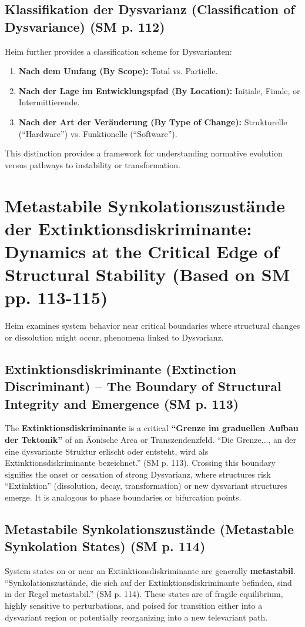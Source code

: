 \documentclass[
    12pt,              %
    a4paper,           %
    headings=normal,   %
    twoside=true,      %
    BCOR=8mm,          %
]{scrbook}
\newcommand{\q}[1]{\enquote{#1}}
\begin{document}
\subsection{Klassifikation der Dysvarianz (Classification of Dysvariance) (SM p. 112)}
\label{sec:ch6_klassifikation_dysvarianz}
Heim further provides a classification scheme for Dysvarianten:
\begin{enumerate}
    \item  \textbf{Nach dem Umfang (By Scope):} Total vs. Partielle.
    \item  \textbf{Nach der Lage im Entwicklungspfad (By Location):} Initiale, Finale, or Intermittierende.
    \item  \textbf{Nach der Art der Veränderung (By Type of Change):} Strukturelle (\q{Hardware}) vs. Funktionelle (\q{Software}).
\end{enumerate}
This distinction provides a framework for understanding normative evolution versus pathways to instability or transformation.

\section{Metastabile Synkolationszustände der Extinktionsdiskriminante: Dynamics at the Critical Edge of Structural Stability (Based on SM pp. 113-115)}
\label{sec:ch6_metastabilitaet}

Heim examines system behavior near critical boundaries where structural changes or dissolution might occur, phenomena linked to Dysvarianz.

\subsection{Extinktionsdiskriminante (Extinction Discriminant) – The Boundary of Structural Integrity and Emergence (SM p. 113)}
\label{sec:ch6_extinktionsdiskriminante}
The \textbf{Extinktionsdiskriminante} is a critical \textbf{\q{Grenze im graduellen Aufbau der Tektonik}} of an Äonische Area or Transzendenzfeld. \q{Die Grenze..., an der eine dysvariante Struktur erlischt oder entsteht, wird als Extinktionsdiskriminante bezeichnet.} (SM p. 113). Crossing this boundary signifies the onset or cessation of strong Dysvarianz, where structures risk \q{Extinktion} (dissolution, decay, transformation) or new dysvariant structures emerge. It is analogous to phase boundaries or bifurcation points.

\subsection{Metastabile Synkolationszustände (Metastable Synkolation States) (SM p. 114)}
\label{sec:ch6_metastabile_zustaende}
System states on or near an Extinktionsdiskriminante are generally \textbf{metastabil}. \q{Synkolationszustände, die sich auf der Extinktionsdiskriminante befinden, sind in der Regel metastabil.} (SM p. 114). These states are of fragile equilibrium, highly sensitive to perturbations, and poised for transition either into a dysvariant region or potentially reorganizing into a new televariant path.
\end{document}
